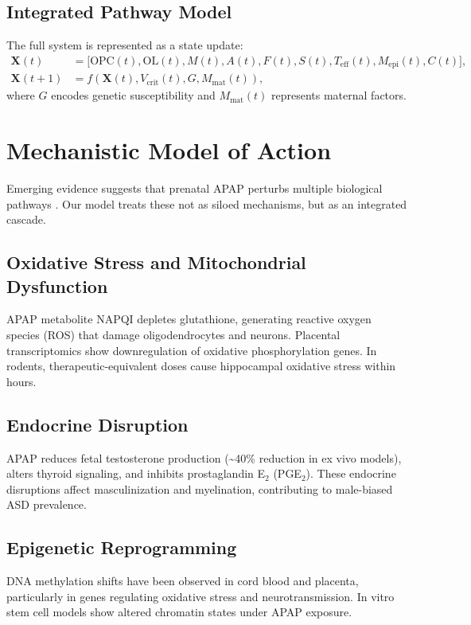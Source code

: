 \documentclass[12pt]{article}
\begin{document}
\subsection{Integrated Pathway Model}
The full system is represented as a state update:
\begin{align}
\mathbf{X}(t) &= \big[\text{OPC}(t), \text{OL}(t), M(t), A(t), F(t), S(t), T_{\text{eff}}(t), M_{\text{epi}}(t), C(t)\big], \\
\mathbf{X}(t+1) &= f\!\left(\mathbf{X}(t), V_{\text{crit}}(t), G, M_{\text{mat}}(t)\right),
\end{align}
where $G$ encodes genetic susceptibility and $M_{\text{mat}}(t)$ represents maternal factors.





\section{Mechanistic Model of Action}
Emerging evidence suggests that prenatal APAP perturbs multiple biological pathways \citep{baker2020, kristensen2016, zhu2021}. Our model treats these not as siloed mechanisms, but as an integrated cascade.

\subsection{Oxidative Stress and Mitochondrial Dysfunction}
APAP metabolite NAPQI depletes glutathione, generating reactive oxygen species (ROS) that damage oligodendrocytes and neurons. Placental transcriptomics show downregulation of oxidative phosphorylation genes. In rodents, therapeutic-equivalent doses cause hippocampal oxidative stress within hours.

\subsection{Endocrine Disruption}
APAP reduces fetal testosterone production (\textasciitilde40\% reduction in ex vivo models), alters thyroid signaling, and inhibits prostaglandin E$_2$ (PGE$_2$). These endocrine disruptions affect masculinization and myelination, contributing to male-biased ASD prevalence.

\subsection{Epigenetic Reprogramming}
DNA methylation shifts have been observed in cord blood and placenta, particularly in genes regulating oxidative stress and neurotransmission. In vitro stem cell models show altered chromatin states under APAP exposure.
\end{document}
